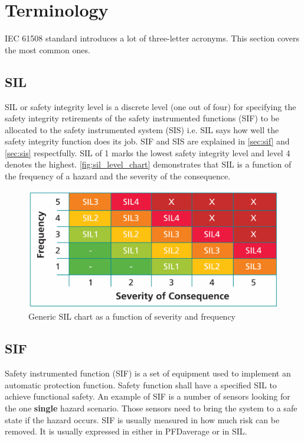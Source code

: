\section{Terminology}

IEC 61508 standard introduces a lot of three-letter acronyms. This section covers the most common ones.

\subsection{SIL}

SIL or safety integrity level is a discrete level (one out of four) for specifying the safety integrity retirements of the safety instrumented functions (SIF) to be allocated to the safety instrumented system (SIS) i.e. SIL says how well the safety integrity function does its job. SIF and SIS are explained in \autoref{sec:sif}  and \autoref{sec:sis} respectfully. SIL of 1 marks the lowest safety integrity level and level 4 denotes the highest.  \autoref{fig:sil_level_chart} demonstrates that SIL is a function of the frequency of a hazard and the severity of the consequence. 


\begin{figure}[H]

      \centering
      \includegraphics[width=0.7\linewidth]{images/sil_level_chart.png}
      \caption{Generic SIL chart as a function of severity and frequency}
      \label{fig:sil_level_chart}
    
\end{figure}

\subsection{SIF}
\label{sec:sif}

Safety instrumented function (SIF) is a set of equipment used to implement an automatic protection function. Safety function shall have a specified SIL to achieve functional safety. 
An example of SIF is a number of sensors looking for the one \textbf{single} hazard scenario. Those sensors need to bring the system to a safe state if the hazard occurs. SIF is usually measured in how much risk can be removed. It is usually expressed in either in PFDaverage or in SIL. 

